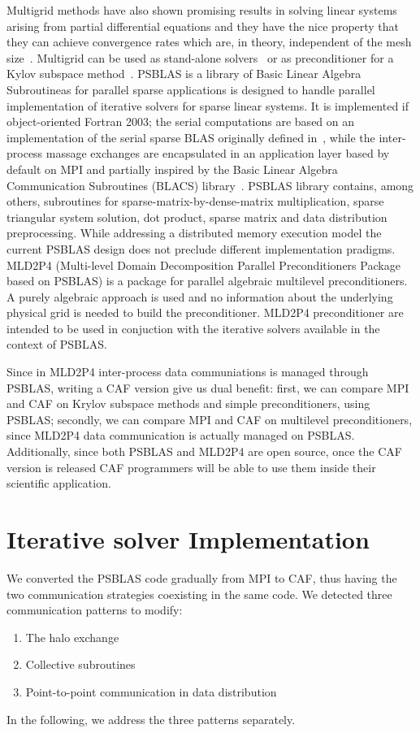 \documentclass{IOS-Book-Article}
\begin{document}
Multigrid methods have also shown promising results in solving linear
systems arising from partial differential equations and they have the
nice property that they can achieve convergence rates which are, in
theory, independent of the mesh size~\cite{saad2003iterative}. 
Multigrid can be used as stand-alone solvers~\cite{brandt1977multi}
or as preconditioner for a Kylov subspace
method~\cite{bramble1990parallel}.  
PSBLAS is a library of Basic Linear Algebra Subroutineas for parallel
sparse applications is designed to handle parallel implementation of
iterative solvers for sparse linear systems. It is implemented if
object-oriented Fortran 2003; the serial computations are based on an
implementation of the serial sparse BLAS originally defined
in~\cite{duff2002overview}, while the inter-process 
massage exchanges are encapsulated in an application layer based by
default on MPI and partially inspired by
the Basic Linear Algebra Communication Subroutines (BLACS)
library~\cite{whaley1997user}. PSBLAS library contains, among 
others, 
subroutines for sparse-matrix-by-dense-matrix multiplication, sparse
triangular system solution, dot product, sparse matrix and data
distribution preprocessing. 
While addressing a distributed memory execution model the current
PSBLAS design does not preclude different implementation pradigms. 
MLD2P4 (Multi-level Domain Decomposition Parallel Preconditioners
Package based on PSBLAS) is a package for parallel algebraic
multilevel preconditioners. A purely algebraic approach is used and no
information about the underlying physical grid is needed to build the
preconditioner. MLD2P4 preconditioner are intended to be used in
conjuction with the iterative solvers available in the context of
PSBLAS.

Since in MLD2P4 inter-process data communiations is managed through
PSBLAS, writing a CAF version give us dual benefit: first, we can compare MPI and CAF on Krylov subspace methods and simple preconditioners, using PSBLAS; secondly, we can compare MPI and CAF on multilevel preconditioners, since MLD2P4 data communication is actually managed on PSBLAS. 
Additionally, since both PSBLAS and MLD2P4 are open source, once the
CAF version is released CAF programmers will be able to use them
inside their scientific application. 

 
\section{Iterative solver Implementation}
We converted the PSBLAS code gradually from MPI to CAF, thus having
the two communication strategies coexisting in the same code.  
We detected three communication patterns to modify:
\begin{enumerate}
\item The halo exchange
\item Collective subroutines
\item Point-to-point communication in data distribution
\end{enumerate}
In the following, we address the three patterns  separately.
\end{document}
